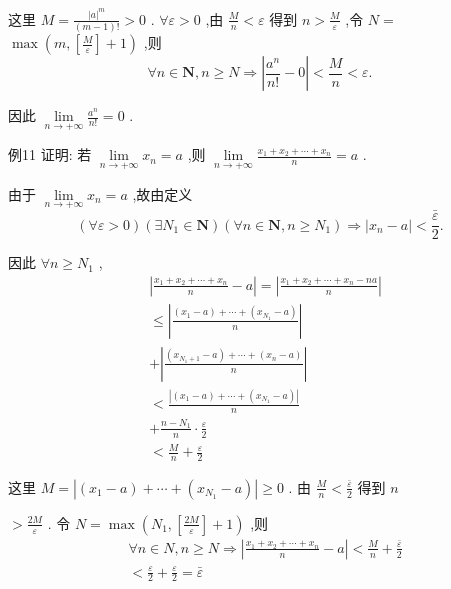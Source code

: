 这里 $M = \frac{{\left| a\right| }^{m}}{\left( {m - 1}\right) !} > 0$ . $\forall \varepsilon  > 0$ ,由 $\frac{M}{n} < \varepsilon$ 得到 $n > \frac{M}{\varepsilon }$ ,令 $N =$  $\max \left( {m,\left\lbrack  \frac{M}{\varepsilon }\right\rbrack   + 1}\right)$ ,则
$$\forall n \in  \mathbf{N},n \geq  N \Rightarrow  \left| {\frac{{a}^{n}}{n!} - 0}\right|  < \frac{M}{n} < \varepsilon .$$

因此 $\mathop{\lim }\limits_{{n \rightarrow   + \infty }}\frac{{a}^{n}}{n!} = 0$ .

例11 证明: 若 $\mathop{\lim }\limits_{{n \rightarrow   + \infty }}{x}_{n} = a$ ,则 $\mathop{\lim }\limits_{{n \rightarrow   + \infty }}\frac{{x}_{1} + {x}_{2} + \cdots  + {x}_{n}}{n} = a$ .

由于 $\mathop{\lim }\limits_{{n \rightarrow   + \infty }}{x}_{n} = a$ ,故由定义
$$\left( {\forall \varepsilon  > 0}\right) \left( {\exists {N}_{1} \in  \mathbf{N}}\right) \left( {\forall n \in  \mathbf{N},n \geq  {N}_{1}}\right)  \Rightarrow  \left| {{x}_{n} - a}\right|  < \frac{\bar{\varepsilon }}{2}.$$

因此 $\forall n \geq  {N}_{1}$ ,
\begin{align*}
	&\left| {\frac{{x}_{1} + {x}_{2} + \cdots  + {x}_{n}}{n} - a}\right|  = \left| \frac{{x}_{1} + {x}_{2} + \cdots  + {x}_{n} - {na}}{n}\right|\\
	&\leq  \left| \frac{\left( {{x}_{1} - a}\right)  + \cdots  + \left( {{x}_{{N}_{1}} - a}\right) }{n}\right|\\
	&+ \left| \frac{\left( {{x}_{{N}_{1} + 1} - a}\right)  + \cdots  + \left( {{x}_{n} - a}\right) }{n}\right|\\
	&< \frac{\left| \left( {x}_{1} - a\right)  + \cdots  + \left( {x}_{{N}_{1}} - a\right) \right| }{n}\\
	&+ \frac{n - {N}_{1}}{n} \cdot  \frac{\varepsilon }{2}\\
	&< \frac{M}{n} + \frac{\varepsilon }{2}
\end{align*}

这里 $M = \left| {\left( {{x}_{1} - a}\right)  + \cdots  + \left( {{x}_{{N}_{1}} - a}\right) }\right|  \geq  0$ . 由 $\frac{M}{n} < \frac{\bar{\varepsilon }}{2}$ 得到 $n$

$> \frac{2M}{\varepsilon }$ . 令 $N = \max \left( {{N}_{1},\left\lbrack  \frac{2M}{\varepsilon }\right\rbrack   + 1}\right)$ ,则
\begin{align*}
	&\forall n \in  N,n \geq  N \Rightarrow  \left| {\frac{{x}_{1} + {x}_{2} + \cdots  + {x}_{n}}{n} - a}\right|  < \frac{M}{n} + \frac{\bar{\varepsilon }}{2}\\
	&< \frac{\varepsilon }{2} + \frac{\varepsilon }{2} = \bar{\varepsilon }
\end{align*}

